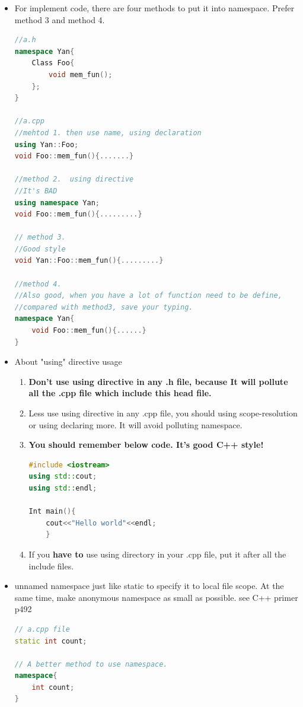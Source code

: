\documentclass[a4paper,12pt,twoside]{book}
\newcommand{\Hilight}[1]{\makebox[0pt][l]{\color{yellow}\rule[-3pt]{#1em}{11pt}}}
\begin{document}
\begin{itemize}
\begin{lstlisting}[frame=single, language=c++, mathescape=true]
#include <iostream>
#include <string>
$\Hilight{15}$using std::string;
int main(){
	string str = "Example";
	$\Hilight{15}$using std::cout;
	cout << str;
}
\end{lstlisting}
	
	
	\item For implement code, there are four methods to put it into namespace. Prefer method 3 and method 4.
	
\begin{lstlisting}[frame=single, language=c++]
//a.h
namespace Yan{
	Class Foo{
		void mem_fun();
	};
}
	
//a.cpp
//mehtod 1. then use name, using declaration
using Yan::Foo;
void Foo::mem_fun(){.......}
	
//method 2.  using directive
//It's BAD
using namespace Yan;
void Foo::mem_fun(){.........}
	
// method 3.
//Good style
void Yan::Foo::mem_fun(){.........}
	
//method 4.
//Also good, when you have a lot of function need to be define,
//compared with method3, save your typing.
namespace Yan{
	void Foo::mem_fun(){......}
}
	\end{lstlisting}
	
	\item About "using" directive usage
	\begin{enumerate}
		\item  \textbf{Don't use using directive in any .h file,  because It will pollute all the .cpp file which include this head file.}
		
		\item  Less use using directive in any .cpp file, you should using scope-resolution or using declaring more. It will avoid polluting namespace.
		
		\item \textbf{You should remember below code. It's good C++ style!} 
\begin{lstlisting}[frame=single, language=c++]
#include <iostream>
using std::cout;
using std::endl;
		
Int main(){
	cout<<"Hello world"<<endl;
	}
\end{lstlisting}
		
		\item If you \textbf{have to} use using directory in your .cpp file, put it after all the include files.
	\end{enumerate}
	
	\item unnamed namespace just like static to specify it to local file scope. At the same time, make anonymous namespace as small as possible.  see C++ primer p492
	
\begin{lstlisting}[frame=single, language=c++]
// a.cpp file
static int count;
	
// A better method to use namespace.
namespace{
	int count;
}
	\end{lstlisting}
	
\end{itemize}
\end{document}
